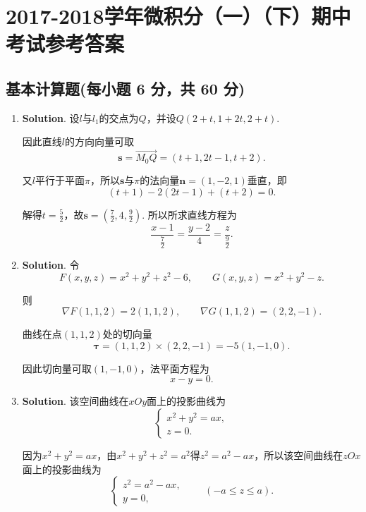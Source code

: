 \documentclass[../Main.tex]{subfiles}
\begin{document}
\chapter{2017-2018学年微积分（一）（下）期中考试参考答案}
\section{基本计算题(每小题 6 分，共 60 分)}
\begin{enumerate}
    \item \textbf{Solution}. 设$l$与$l_{1}$的交点为$Q$，并设$Q(2+t,1+2t,2+t)$.

          因此直线$l$的方向向量可取
          \[
              \boldsymbol{s}=\overrightarrow{M_0Q}=(t+1,2t-1,t+2).
          \]

          又$l$平行于平面$\pi$，所以$\boldsymbol{s}$与$\pi$的法向量$\boldsymbol{n}=(1
              ,-2,1)$垂直，即
          \[
              (t+1)-2(2t-1)+(t+2)=0.
          \]

          解得$t=\frac{5}{2}$，故$\boldsymbol{s}=\left(\frac{7}{2},4,\frac{9}{2}\right
              )$. 所以所求直线方程为
          \[
              \frac{x-1}{\frac{7}{2}}=\frac{y-2}{4}=\frac{z}{\frac{9}{2}}.
          \]

    \item \textbf{Solution}. 令
          \[
              F(x,y,z)=x^{2}+y^{2}+z^{2}-6,\qquad G(x,y,z)=x^{2}+y^{2}-z.
          \]

          则
          \[
              \nabla F(1,1,2)=2(1,1,2),\qquad \nabla G(1,1,2)=(2,2,-1).
          \]

          曲线在点$(1,1,2)$处的切向量
          \[
              \boldsymbol{\tau}=(1,1,2)\times(2,2,-1)=-5(1,-1,0).
          \]

          因此切向量可取$(1,-1,0)$，法平面方程为
          \[
              x-y=0.
          \]

    \item \textbf{Solution}. 该空间曲线在$xOy$面上的投影曲线为
          \[
              \begin{cases}
                  x^{2}+y^{2}=ax, \\
                  z=0.
              \end{cases}
          \]

          因为$x^{2}+y^{2}=ax$，由$x^{2}+y^{2}+z^{2}=a^{2}$得$z^{2}=a^{2}-ax$，所以该空间曲线在$z
              Ox$面上的投影曲线为
          \[
              \begin{cases}
                  z^{2}=a^{2}-ax, \\
                  y=0,
              \end{cases}\qquad (-a\leq z\leq a).
          \]


\end{enumerate}
\end{document}
